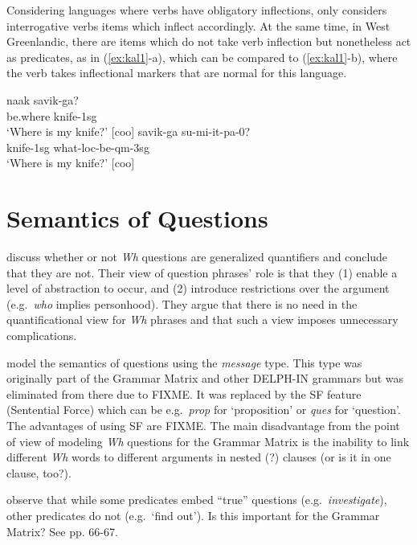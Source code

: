 \documentclass [11pt, proquest] {uwthesis}[2016/11/22]
\newcommand{\wh}{{\it Wh}}
\begin{document}
Considering languages where verbs have obligatory inflections, \citet{hagege2008towards} only considers interrogative verbs items which inflect accordingly. At the same time, in West Greenlandic, there are items which do not take verb inflection but nonetheless act as predicates, as in (\ref{ex:kal1}-a), which can be compared to (\ref{ex:kal1}-b), where the verb takes inflectional markers that are normal for this language.

 \begin{exe}
 \ex
 \begin{xlist}
 \ex \gll naak savik-ga?\\
 be.where knife-{\sc 1sg}\\
 `Where is my knife?' [coo] \cite[p. 9]{hagege2008towards}
 \ex \gll savik-ga su-mi-it-pa-0?\\
 knife-{\sc 1sg} what-{\sc loc}-be-{\sc qm-3sg}\\
 `Where is my knife?' [coo] \cite[p. 9]{hagege2008towards}
 \end{xlist}
 \label{ex:kal1}
 \end{exe}

\section{Semantics of Questions}
\citet{ginzburg2000interrogative} discuss whether or not {\wh} questions are generalized quantifiers and
conclude that they are not. Their view of question phrases' role is that they (1) enable a level of abstraction to occur, and
(2) introduce restrictions over the argument (e.g.\ {\it who} implies personhood). They argue that there is no need in
the quantificational view for {\wh} phrases and that such a view imposes unnecessary complications. 

\citet{ginzburg2000interrogative} model the semantics of questions using the {\it message} type. This type
was originally part of the Grammar Matrix and other DELPH-IN grammars but was eliminated from there
due to FIXME. It was replaced by the SF feature (Sentential Force) which can be e.g.\ {\it prop} for `proposition' 
or {\it ques} for `question'. The advantages of using SF are FIXME. The main disadvantage from the point of view of
modeling {\wh} questions for the Grammar Matrix is the inability to link different {\wh} words to different arguments in
nested (?) clauses (or is it in one clause, too?).

\citet{ginzburg2000interrogative} observe that while some predicates embed ``true'' questions (e.g.\ {\it investigate}),
other predicates do not (e.g.\ `find out'). Is this important for the Grammar Matrix? See pp. 66-67.
\end{document}
